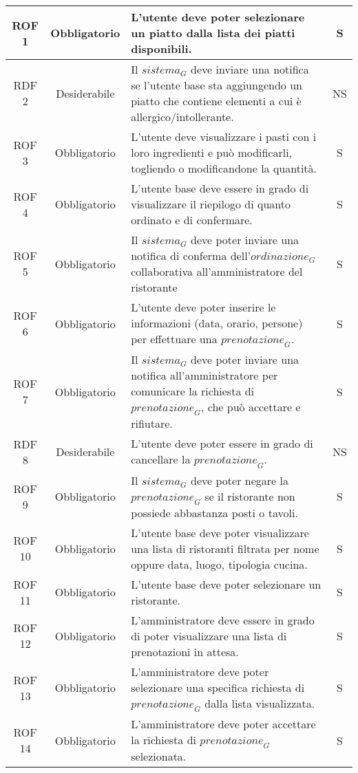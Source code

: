 \begin{longtable}{|c|c|p{12cm}|c|}
ROF 1 & Obbligatorio & L’utente deve poter selezionare un piatto dalla lista dei piatti disponibili. & S \\
\hline
RDF 2 & Desiderabile & Il $\textit{sistema}_G$ deve inviare una notifica se l'utente base sta aggiungendo un piatto che contiene elementi a cui è allergico/intollerante. & NS\\
\hline
ROF 3 & Obbligatorio & L'utente deve visualizzare i pasti con i loro ingredienti e può modificarli, togliendo o modificandone la quantità. & S\\
\hline
ROF 4 & Obbligatorio & L'utente base deve essere in grado di visualizzare il riepilogo di quanto ordinato e di confermare. & S\\
\hline
ROF 5 & Obbligatorio & Il $\textit{sistema}_G$ deve poter inviare una notifica di conferma dell'$\textit{ordinazione}_G$ collaborativa all'amministratore del ristorante & S\\
\hline
ROF 6 & Obbligatorio & L'utente deve poter inserire le informazioni (data, orario, persone) per effettuare una $\textit{prenotazione}_G$. & S\\
\hline
ROF 7 & Obbligatorio & Il $\textit{sistema}_G$ deve poter inviare una notifica all'amministratore per comunicare la richiesta di $\textit{prenotazione}_G$, che può accettare e rifiutare. & S\\
\hline
RDF 8 & Desiderabile & L'utente deve poter essere in grado di cancellare la $\textit{prenotazione}_G$. & NS\\
\hline
ROF 9 & Obbligatorio & Il $\textit{sistema}_G$ deve poter negare la $\textit{prenotazione}_G$ se il ristorante non possiede abbastanza posti o tavoli. & S\\
\hline
ROF 10 & Obbligatorio & L'utente base deve poter visualizzare una lista di ristoranti filtrata per nome oppure data, luogo, tipologia cucina. & S\\
\hline
ROF 11 & Obbligatorio & L'utente base deve poter selezionare un ristorante.  & S\\
\hline
ROF 12 & Obbligatorio & L'amministratore deve essere in grado di poter visualizzare una lista di prenotazioni in attesa. & S\\
\hline
ROF 13 & Obbligatorio & L'amministratore deve poter selezionare una specifica richiesta di $\textit{prenotazione}_G$ dalla lista visualizzata. & S\\
\hline
ROF 14& Obbligatorio & L'amministratore deve poter accettare la richiesta di $\textit{prenotazione}_G$ selezionata. & S\\

\end{longtable}

